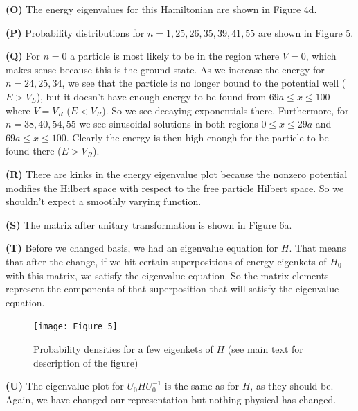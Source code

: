 \documentclass[12pt]{article}
\theoremstyle{definition}
\begin{document}
{\vspace{0.1in}
\noindent \textbf{(O)} The energy eigenvalues for this Hamiltonian are shown in Figure 4d.

\vspace{0.1in}
\noindent \textbf{(P)} Probability distributions for $n=1, 25, 26, 35, 39, 41, 55$ are shown in Figure 5.

\vspace{0.1in}
\noindent \textbf{(Q)} For $n=0$ a particle is most likely to be in the region where $V=0$, which makes sense because this is the ground state. As we increase the energy for $n=24,25,34$, we see that the particle is no longer bound to the potential well ($E > V_{L}$), but it doesn't have enough energy to be found from $69a\leq x \leq 100$ where $V=V_{R}$ ($E < V_{R}$). So we see decaying exponentials there. Furthermore, for $n=38,40,54,55$ we see sinusoidal solutions in both regions $0 \leq x \leq 29a$ and $69a\leq x \leq 100$. Clearly the energy is then high enough for the particle to be found there ($E > V_{R}$).

\vspace{0.1in}
\noindent \textbf{(R)} There are kinks in the energy eigenvalue plot because the nonzero potential modifies the Hilbert space with respect to the free particle Hilbert space. So we shouldn't expect a smoothly varying function.

\vspace{0.1in}
\noindent \textbf{(S)} The matrix after unitary transformation is shown in Figure 6a.

\vspace{0.1in}
\noindent \textbf{(T)} Before we changed basis, we had an eigenvalue equation for $H$. That means that after the change, if we hit certain superpositions of energy eigenkets of $H_0$ with this matrix, we satisfy the eigenvalue equation. So the matrix elements represent the components of that superposition that will satisfy the eigenvalue equation.

\begin{figure}[t!]
\centering
\texttt{[image: Figure\_5]}
\caption{Probability densities for a few eigenkets of $H$ (see main text for description of the figure)}
\label{fig:method}
\end{figure}
\vspace{0.1in}
\noindent \textbf{(U)} The eigenvalue plot for $U_{0}H U_{0}^{-1}$ is the same as for $H$, as they should be. Again, we have changed our representation but nothing physical has changed.

}
\end{document}
